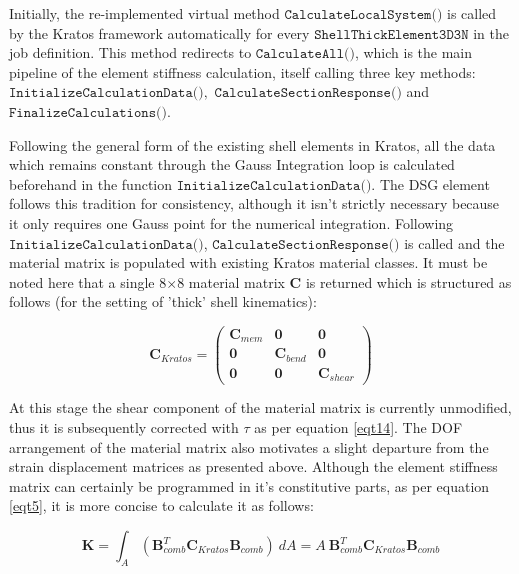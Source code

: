 Initially, the re-implemented virtual method $\texttt{CalculateLocalSystem()}$ is called by the Kratos framework automatically for every $\texttt{ShellThickElement3D3N}$ in the job definition. This method redirects to $\texttt{CalculateAll()}$, which is the main pipeline of the element stiffness calculation, itself calling three key methods: $\texttt{InitializeCalculationData()},$ \break$\texttt{CalculateSectionResponse()}$ and $\texttt{FinalizeCalculations()}$.

Following the general form of the existing shell elements in Kratos, all the data which remains constant through the Gauss Integration loop is calculated beforehand in the function $\texttt{InitializeCalculationData()}$. The DSG element follows this tradition for consistency, although it isn't strictly necessary because it only requires one Gauss point for the numerical integration. Following $\texttt{InitializeCalculationData()}$, $\texttt{CalculateSectionResponse()}$ is called and the material matrix is populated with existing Kratos material classes. It must be noted here that a single 8$\times$8 material matrix $\mathbf{C}$ is returned which is structured as follows (for the setting of 'thick' shell kinematics):

\begin{equation} 
\mathbf{C}_{Kratos} =  
\begin{pmatrix}
	\mathbf{C}_{mem} & \mathbf{0} & \mathbf{0} \\
	\mathbf{0} & \mathbf{C}_{bend} & \mathbf{0} \\
	\mathbf{0} & 	\mathbf{0} & \mathbf{C}_{shear}
\end{pmatrix}
\label{eqtCkratos}
\end{equation} 

At this stage the shear component of the material matrix is currently unmodified, thus it is subsequently corrected with $\tau$ as per equation \eqref{eqt14}. The DOF arrangement of the material matrix also motivates a slight departure from the strain displacement matrices as presented above. Although the element stiffness matrix can certainly be programmed in it's constitutive parts, as per equation \eqref{eqt5}, it is more concise to calculate it as follows:

\begin{equation} 
\mathbf{K} = \int_A  (\mathbf{B}_{comb}^T \mathbf{C}_{Kratos} \mathbf{B}_{comb} )\ dA
= A\  \mathbf{B}_{comb}^T \mathbf{C}_{Kratos} \mathbf{B}_{comb} 
\label{eqtKkratos}
\end{equation}

